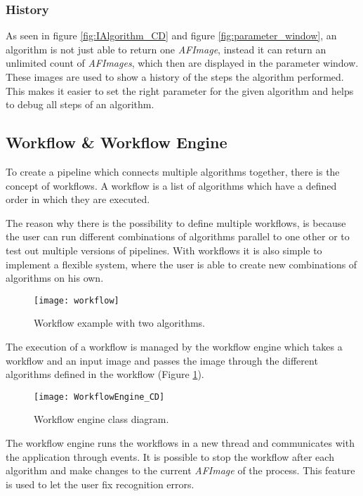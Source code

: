 \subsubsection{History}
As seen in figure \ref{fig:IAlgorithm_CD} and figure \ref{fig:parameter_window}, an algorithm is not just able to return one \textit{AFImage}, instead it can return an unlimited count of \textit{AFImages}, which then are displayed in the parameter window. These images are used to show a history of the steps the algorithm performed. This makes it easier to set the right parameter for the given algorithm and helps to debug all steps of an algorithm.

\subsection{Workflow \& Workflow Engine}
To create a pipeline which connects multiple algorithms together, there is the concept of workflows. A workflow is a list of algorithms which have a defined order in which they are executed.

The reason why there is the possibility to define multiple workflows, is because the user can run different combinations of algorithms parallel to one other or to test out multiple versions of pipelines. With workflows it is also simple to implement a flexible system, where the user is able to create new combinations of algorithms on his own.

\begin{figure}[H]
  \centering
      \texttt{[image: workflow]}
  \caption{Workflow example with two algorithms.}
  \label{fig:Workflow}
\end{figure}

The execution of a workflow is managed by the workflow engine which takes a workflow and an input image and passes the image through the different algorithms defined in the workflow (Figure \ref{fig:Workflow}).

\begin{figure}[H]
  \centering
      \texttt{[image: WorkflowEngine\_CD]}
  \caption{Workflow engine class diagram.}
  \label{fig:WorkflowEngine_CD}
\end{figure}

The workflow engine runs the workflows in a new thread and communicates with the application through events. It is possible to stop the workflow after each algorithm and make changes to the current \textit{AFImage} of the process. This feature is used to let the user fix recognition errors.

